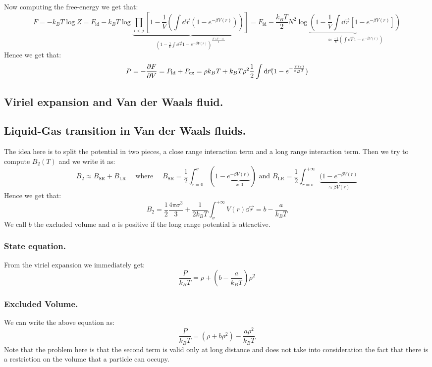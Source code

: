 \documentclass[10pt,a4paper]{book}
\begin{document}
Now computing the free-energy we get that:
\[
F = -k_B T \log Z = F_\text{id} - k_B T \log  \underbrace{\prod_{i < j} \left[1 - \frac{1}{V}\left(\int \dd \vec{r} (1 - e^{-\beta V(r)}) \right) \right]}_{\left(1 - \frac{1}{V} \int \dd \vec{r} 1 - e^{-\beta V(r)}\right)^{\frac{N(N-1)}{2}}} = F_\text{id} - \frac{k_B T}{2}N^2 \log \underbrace{\left(1 - \frac{1}{V} \int \dd \vec{r} [1 - e^{-\beta V(r)}]\right)}_{\approx \frac{-1}{V} \left( \int \dd \vec{r} 1 - e^{-\beta V(r)}\right)}
\]
Hence we get that:
\[
P = - \pdv{F}{V} = P_\text{id} + P_\text{ex} = \rho k_B T + k_B T \rho^2 \frac{1}{2} \int \dd \vec{r} (1 - e^{-\frac{V(r)}{k_B T}})
\]

\subsection{Viriel expansion and Van der Waals fluid.}
\subsection{Liquid-Gas transition in Van der Waals fluids.}
The idea here is to split the potential in two pieces, a close range interaction term and a long range interaction term. Then we try to compute $B_2(T)$ and we write it as:
\[
B_2 \approx B_\text{SR} + B_\text{LR} \quad \text{ where } \quad B_\text{SR} = \frac{1}{2} \int_{r = 0}^\sigma (1 - \underbrace{e^{-\beta V(r)}}_{ \approx 0}) \text{ and } B_\text{LR} = \frac{1}{2} \int_{r = \sigma}^{+\infty} \underbrace{(1 - e^{-\beta V(r)}}_{\approx \beta V(r)} 
\]
Hence we get that:
\[
B_2 = \frac{1}{2} \frac{4 \pi \sigma^3}{3} + \frac{1}{2 k_B T} \int_\sigma^{+\infty} V(r) \dd \vec{r} = b - \frac{a}{k_B T}
\]
We call $b$ the excluded volume and $a$ is positive if the long range potential is attractive.

\subsubsection{State equation.}
From the viriel expansion we immediately get:
\[
\frac{P}{k_B T} = \rho + (b - \frac{a}{k_B T}) \rho^2
\]

\subsubsection{Excluded Volume.}
We can write the above equation as:
\[
\frac{P}{k_B T} = (\rho + b \rho^2) - \frac{a\rho^2}{k_B T}
\]
Note that the problem here is that the second term is valid only at long distance and does not take into consideration the fact that there is a restriction on the volume that a particle can occupy.
\end{document}
